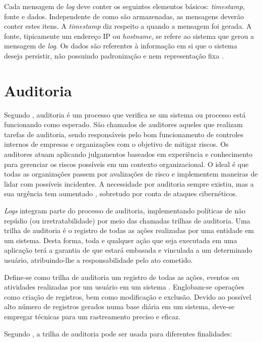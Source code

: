 Cada mensagem de \emph{log} deve conter os seguintes elementos básicos: \emph{timestamp}, fonte e dados. Independente de como são armazenadas, as mensagens deverão conter estes itens. A \emph{timestamp} diz respeito a quando a mensagem foi gerada. A fonte, tipicamente um endereço IP ou \emph{hostname}, se refere ao sistema que gerou a mensagem de \emph{log}. Os dados são referentes à informação em si que o sistema deseja persistir, não possuindo padronização e nem representação fixa \cite{Chuvakin2013-za}.

\section{Auditoria}
Segundo \cite{Chuvakin2013-za}, auditoria é um processo que verifica se um sistema ou processo está funcionando como esperado. São chamados de auditores aqueles que realizam tarefas de auditoria, sendo responsáveis pelo bom funcionamento de controles internos \cite{Champlain2003-za} de empresas e organizações com o objetivo de mitigar riscos. Os auditores atuam aplicando julgamentos baseados em experiência e conhecimento para gerenciar os riscos possíveis em um contexto organizacional. O ideal é que todas as organizações passem por avalizações de risco e implementem maneiras de lidar com possíveis incidentes. A necessidade por auditoria sempre existiu, mas a sua urgência tem aumentado \cite{Champlain2003-za}, sobretudo por conta de ataques cibernéticos.

\emph{Logs} integram parte do processo de auditoria, implementando políticas de não repúdio (ou irretratabilidade) por meio das chamadas trilhas de auditoria. Uma trilha de auditoria é o registro de todas as ações realizadas por uma entidade em um sistema. Desta forma, toda e qualquer ação que seja executada em uma aplicação terá a garantia de que estará embasada e vinculada a um determinado usuário, atribuindo-lhe a responsabilidade pelo ato cometido. 

Define-se como trilha de auditoria um registro de todas as ações, eventos ou atividades realizadas por um usuário em um sistema \cite{privacytech_2020}. Englobam-se operações como criação de registros, bem como modificação e exclusão. Devido ao possível alto número de registros gerados numa base diária em um sistema, deve-se empregar técnicas para um rastreamento preciso e eficaz.

Segundo \cite{privacytech_2020}, a trilha de auditoria pode ser usada para diferentes finalidades:

